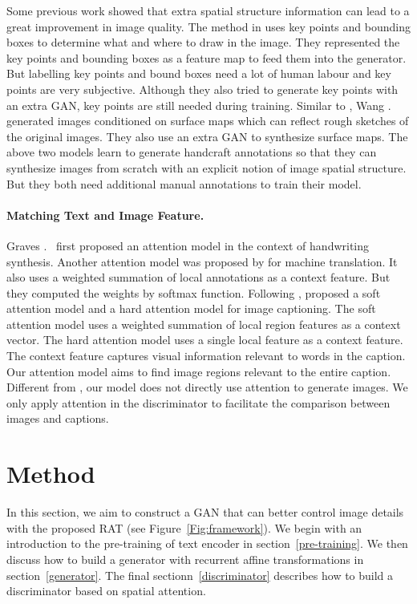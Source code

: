 \documentclass{article}
\begin{document}
	Some previous work \cite{DBLP:journals/pami/ZhangXLZWHM19,DBLP:conf/icml/ReedAYLSL16} showed that extra spatial structure information can lead to a great improvement in image quality. The method in \cite{DBLP:conf/icml/ReedAYLSL16} uses key points and bounding boxes to determine what and where to draw in the image. They represented the key points and bounding boxes as a feature map to feed them into the generator. But labelling key points and bound boxes need a lot of human labour and key points are very subjective. Although they also tried to generate key points with an extra GAN, key points are still needed during training.  
	Similar to \cite{DBLP:conf/icml/ReedAYLSL16}, Wang . \cite{wang2016generative} generated images conditioned on surface maps which can reflect rough sketches of the original images. They also use an extra GAN to synthesize surface maps. The above two models learn to generate handcraft annotations so that they can synthesize images from scratch with an explicit notion of image spatial structure. But they both need additional manual annotations to train their model. 
	
	
	
	\paragraph{Matching Text and Image Feature.}
	Graves .~\cite{graves2014neural} first proposed an attention model in the context of handwriting synthesis. 	
	Another attention model was proposed by \cite{DBLP:journals/corr/BahdanauCB14} for machine translation. It also uses a weighted summation of local annotations as a context feature. But they computed the weights by softmax function. Following \cite{DBLP:journals/corr/BahdanauCB14}, \cite{DBLP:conf/icml/XuBKCCSZB15} proposed a soft attention model and a hard attention model for image captioning. The soft attention model uses a weighted summation of local region features as a context vector. The hard attention model uses a single local feature as a context feature. The context feature captures visual information relevant to words in the caption. 	Our attention model aims to find image regions relevant to the entire caption. Different from \cite{DBLP:journals/corr/MansimovPBS15}, our model does not directly use attention to generate images. We only apply attention in the discriminator to facilitate the comparison between images and captions.
	
	
	
	\section{Method}
	 In this section, we aim to construct a GAN that can better control image details with the proposed RAT  (see Figure~\ref{Fig:framework}). We begin with an introduction to the pre-training of text encoder in section~\ref{pre-training}.  We then discuss how to build a generator with recurrent affine transformations in section~\ref{generator}. The final sectionn~\ref{discriminator} describes how to build a discriminator based on spatial attention.
	
\end{document}
